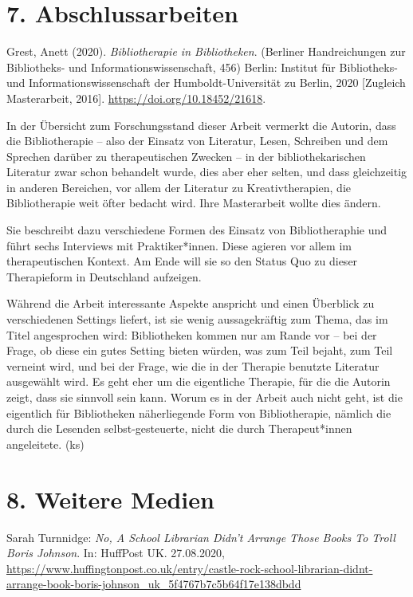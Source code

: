 \documentclass[a4paper,
fontsize=11pt,
oneside,
numbers=noperiodatend,
parskip=half-,
bibliography=totoc,
final
]{scrartcl}
\begin{document}
\hypertarget{abschlussarbeiten}{%
\section{7. Abschlussarbeiten}\label{abschlussarbeiten}}

Grest, Anett (2020). \emph{Bibliotherapie in Bibliotheken}. (Berliner
Handreichungen zur Bibliotheks- und Informationswissenschaft, 456)
Berlin: Institut für Bibliotheks- und Informationswissenschaft der
Humboldt-Universität zu Berlin, 2020 {[}Zugleich Masterarbeit, 2016{]}.
\url{https://doi.org/10.18452/21618}.

In der Übersicht zum Forschungsstand dieser Arbeit vermerkt die Autorin,
dass die Bibliotherapie -- also der Einsatz von Literatur, Lesen,
Schreiben und dem Sprechen darüber zu therapeutischen Zwecken -- in der
bibliothekarischen Literatur zwar schon behandelt wurde, dies aber eher
selten, und dass gleichzeitig in anderen Bereichen, vor allem der
Literatur zu Kreativtherapien, die Bibliotherapie weit öfter bedacht
wird. Ihre Masterarbeit wollte dies ändern.

Sie beschreibt dazu verschiedene Formen des Einsatz von Bibliotheraphie
und führt sechs Interviews mit Praktiker*innen. Diese agieren vor allem
im therapeutischen Kontext. Am Ende will sie so den Status Quo zu dieser
Therapieform in Deutschland aufzeigen.

Während die Arbeit interessante Aspekte anspricht und einen Überblick zu
verschiedenen Settings liefert, ist sie wenig aussagekräftig zum Thema,
das im Titel angesprochen wird: Bibliotheken kommen nur am Rande vor --
bei der Frage, ob diese ein gutes Setting bieten würden, was zum Teil
bejaht, zum Teil verneint wird, und bei der Frage, wie die in der
Therapie benutzte Literatur ausgewählt wird. Es geht eher um die
eigentliche Therapie, für die die Autorin zeigt, dass sie sinnvoll sein
kann. Worum es in der Arbeit auch nicht geht, ist die eigentlich für
Bibliotheken näherliegende Form von Bibliotherapie, nämlich die durch
die Lesenden selbst-gesteuerte, nicht die durch Therapeut*innen
angeleitete. (ks)

\hypertarget{weitere-medien}{%
\section{8. Weitere Medien}\label{weitere-medien}}

Sarah Turnnidge: \emph{No, A School Librarian Didn't Arrange Those Books
To Troll Boris Johnson}. In: HuffPost UK. 27.08.2020,
\url{https://www.huffingtonpost.co.uk/entry/castle-rock-school-librarian-didnt-arrange-book-boris-johnson_uk_5f4767b7c5b64f17e138dbdd}
\end{document}
